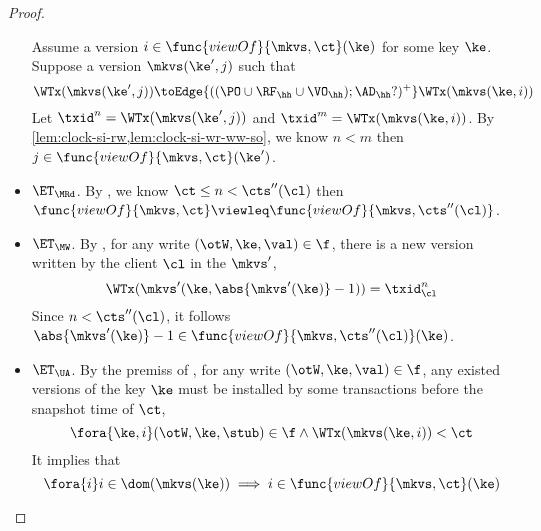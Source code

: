 \begin{proof}
\begin{itemize}
            Assume a version \( i \in \func{viewOf}{\mkvs,\ct}(\ke) \) for some key \( \ke \).
            Suppose a version \( \mkvs(\ke',j)\) such that 
            \[ 
                \WTx(\mkvs(\ke',j)) \toEdge{((\PO \cup \RF_{\hh} \cup \VO_{\hh}) ; \AD_{\hh}?)^+} \WTx(\mkvs(\ke,i))
            \]
            Let \( \txid^n = \WTx(\mkvs(\ke',j)) \) and \( \txid^m = \WTx(\mkvs(\ke,i)) \).
            By \cref{lem:clock-si-rw,lem:clock-si-wr-ww-so}, we know \( n < m \) then \( j  \in \func{viewOf}{\mkvs,\ct}(\ke')\).
        \item \( \ET_\MRd \).
            By , we know \( \ct \leq n < \cts''(\cl) \) then \( \func{viewOf}{\mkvs,\ct} \viewleq \func{viewOf}{\mkvs,\cts''(\cl)} \).
        \item \( \ET_\MW \).
            By , for any write \( (\otW, \ke, \val) \in \f \), there is a new version written by the client \( \cl \) in the \( \mkvs'  \),
            \[
                \WTx(\mkvs'(\ke,\abs{\mkvs'(\ke)} - 1)) = \txid_\cl^{n}
            \]
            Since \( n < \cts''(\cl)\), it follows \( \abs{\mkvs'(\ke)} - 1 \in \func{viewOf}{\mkvs,\cts''(\cl)}(\ke) \).
        \item \( \ET_\UA \).
            By the premiss of , for any write \( (\otW, \ke, \val) \in \f \), any existed versions of the key \( \ke \)
            must be installed by some transactions before the snapshot time of \( \ct \),
            \[
                \fora{\ke,i} (\otW, \ke, \stub) \in \f \land \WTx(\mkvs(\ke,i)) < \ct 
            \]
            It implies that 
            \[ 
                \fora{i} i \in \dom(\mkvs(\ke)) \implies i \in \func{viewOf}{\mkvs,\ct}(\ke) 
            \]
    \end{itemize}
\end{proof}

